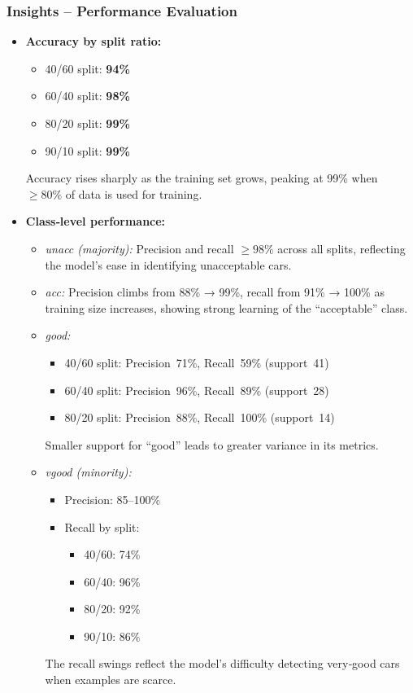 \subsubsection*{Insights – Performance Evaluation}
\begin{itemize}
	\item \textbf{Accuracy by split ratio:}
	      \begin{itemize}
		      \item 40/60 split: \textbf{94\%}
		      \item 60/40 split: \textbf{98\%}
		      \item 80/20 split: \textbf{99\%}
		      \item 90/10 split: \textbf{99\%}
	      \end{itemize}
	      Accuracy rises sharply as the training set grows, peaking at 99\% when \(\geq80\%\) of data is used for training.
	\item \textbf{Class‑level performance:}
	      \begin{itemize}
		      \item \emph{unacc (majority):} Precision and recall \(\geq98\%\) across all splits, reflecting the model’s ease in identifying unacceptable cars.
		      \item \emph{acc:} Precision climbs from 88\% → 99\%, recall from 91\% → 100\% as training size increases, showing strong learning of the “acceptable” class.
		      \item \emph{good:}
		            \begin{itemize}
			            \item 40/60 split: Precision 71\%, Recall 59\% (support 41)
			            \item 60/40 split: Precision 96\%, Recall 89\% (support 28)
			            \item 80/20 split: Precision 88\%, Recall 100\% (support 14)
		            \end{itemize}
		            Smaller support for “good” leads to greater variance in its metrics.

		      \item \emph{vgood (minority):}
		            \begin{itemize}
			            \item Precision: 85–100\%
			            \item Recall by split:
			                  \begin{itemize}
				                  \item 40/60: 74\%
				                  \item 60/40: 96\%
				                  \item 80/20: 92\%
				                  \item 90/10: 86\%
			                  \end{itemize}
		            \end{itemize}
		            The recall swings reflect the model’s difficulty detecting very‐good cars when examples are scarce.


\end{itemize}
\end{itemize}
